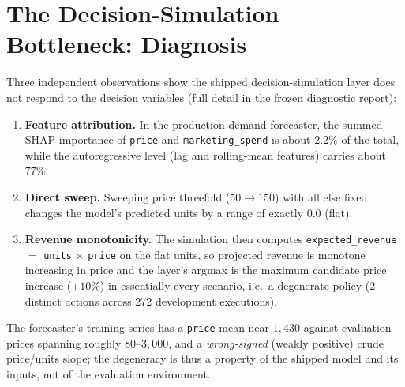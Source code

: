 \documentclass[10pt,twocolumn,a4paper]{article}
\newcommand{\code}[1]{\texttt{#1}}
\begin{document}
\section{The Decision-Simulation Bottleneck: Diagnosis}\label{sec:diag}
Three independent observations show the shipped decision-simulation layer does
not respond to the decision variables (full detail in the frozen diagnostic
report):
\begin{enumerate}
  \item \textbf{Feature attribution.} In the production demand forecaster, the
        summed SHAP importance of \code{price} and \code{marketing\_spend} is
        about $2.2\%$ of the total, while the autoregressive level (lag and
        rolling-mean features) carries about $77\%$.
  \item \textbf{Direct sweep.} Sweeping price threefold ($50\to150$) with all
        else fixed changes the model's predicted units by a range of exactly
        $0.0$ (flat).
  \item \textbf{Revenue monotonicity.} The simulation then computes
        \code{expected\_revenue} $=$ \code{units} $\times$ \code{price} on the
        flat units, so projected revenue is monotone increasing in price and the
        layer's argmax is the maximum candidate price increase ($+10\%$) in
        essentially every scenario, i.e.\ a degenerate policy (2 distinct
        actions across 272 development executions).
\end{enumerate}
The forecaster's training series has a \code{price} mean near $1{,}430$ against
evaluation prices spanning roughly $80$--$3{,}000$, and a \emph{wrong-signed}
(weakly positive) crude price/units slope; the degeneracy is thus a property of
the shipped model and its inputs, not of the evaluation environment.

\end{document}
